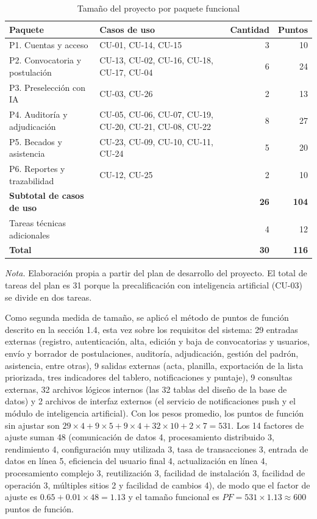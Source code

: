 \begin{table}[H]
\caption{Tamaño del proyecto por paquete funcional}
\label{tab:tamano_paquetes}
\begin{threeparttable}
\begin{tabular}{>{\raggedright\arraybackslash}p{5.6cm} >{\raggedright\arraybackslash}p{4.4cm} r r}
\toprule
Paquete & Casos de uso & Cantidad & Puntos \\
\midrule
P1. Cuentas y acceso & CU-01, CU-14, CU-15 & 3 & 10 \\
P2. Convocatoria y postulación & CU-13, CU-02, CU-16, CU-18, CU-17, CU-04 & 6 & 24 \\
P3. Preselección con IA & CU-03, CU-26 & 2 & 13 \\
P4. Auditoría y adjudicación & CU-05, CU-06, CU-07, CU-19, CU-20, CU-21, CU-08, CU-22 & 8 & 27 \\
P5. Becados y asistencia & CU-23, CU-09, CU-10, CU-11, CU-24 & 5 & 20 \\
P6. Reportes y trazabilidad & CU-12, CU-25 & 2 & 10 \\
\midrule
\textbf{Subtotal de casos de uso} & & \textbf{26} & \textbf{104} \\
Tareas técnicas adicionales & & 4 & 12 \\
\textbf{Total} & & \textbf{30} & \textbf{116} \\
\bottomrule
\end{tabular}
\begin{tablenotes}
\item \textit{Nota.} Elaboración propia a partir del plan de desarrollo del proyecto. El total de tareas del plan es 31 porque la precalificación con inteligencia artificial (CU-03) se divide en dos tareas.
\end{tablenotes}
\end{threeparttable}
\end{table}

Como segunda medida de tamaño, se aplicó el método de puntos de función descrito en la sección 1.4, esta vez sobre los requisitos del sistema: 29 entradas externas (registro, autenticación, alta, edición y baja de convocatorias y usuarios, envío y borrador de postulaciones, auditoría, adjudicación, gestión del padrón, asistencia, entre otras), 9 salidas externas (acta, planilla, exportación de la lista priorizada, tres indicadores del tablero, notificaciones y puntaje), 9 consultas externas, 32 archivos lógicos internos (las 32 tablas del diseño de la base de datos) y 2 archivos de interfaz externos (el servicio de notificaciones push y el módulo de inteligencia artificial). Con los pesos promedio, los puntos de función sin ajustar son $29 \times 4 + 9 \times 5 + 9 \times 4 + 32 \times 10 + 2 \times 7 = 531$. Los 14 factores de ajuste suman 48 (comunicación de datos 4, procesamiento distribuido 3, rendimiento 4, configuración muy utilizada 3, tasa de transacciones 3, entrada de datos en línea 5, eficiencia del usuario final 4, actualización en línea 4, procesamiento complejo 3, reutilización 3, facilidad de instalación 3, facilidad de operación 3, múltiples sitios 2 y facilidad de cambios 4), de modo que el factor de ajuste es $0.65 + 0.01 \times 48 = 1.13$ y el tamaño funcional es $PF = 531 \times 1.13 \approx 600$ puntos de función.

